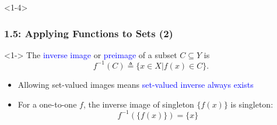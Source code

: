 \documentclass[10pt,english,aspectratio=169]{beamer}
\begin{document}
\begin{frame}<1-4> \frametitle{1.5: Applying Functions to Sets (2)}

\begin{definition}<1->
The \textcolor{blue}{inverse image} or \textcolor{blue}{preimage} of a subset $C\subseteq Y$ is \vspace{-2mm}
\[ f^{-1}(C) \triangleq \{ x\in X | f(x)\in C\}. \]
\end{definition}

\begin{center}
\end{center}
\vspace{-2.5mm}

\begin{itemize}
  \setlength\itemsep{1.25mm}
  \item<3-> Allowing set-valued images means \textcolor{blue}{set-valued inverse always exists}
  \item<4-> For a one-to-one $f$, the inverse image of singleton $\{ f(x) \}$ is singleton: \vspace{-0.5mm}
  \[ f^{-1}( \{f(x) \}) = \{x\} \]
\end{itemize}


\end{frame}  
\end{document}
